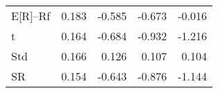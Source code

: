 \begin{tabular}{lrrrr}
\toprule
\midrule
E[R]--Rf & 0.183 & -0.585 & -0.673 & -0.016 \\
t & 0.164 & -0.684 & -0.932 & -1.216 \\
Std & 0.166 & 0.126 & 0.107 & 0.104 \\
SR & 0.154 & -0.643 & -0.876 & -1.144 \\
\bottomrule
\end{tabular}
